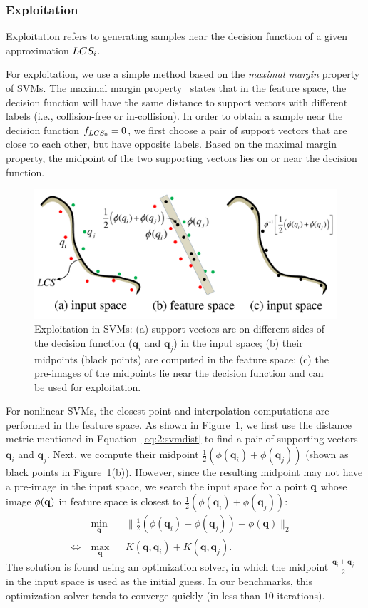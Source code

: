 \subsubsection{Exploitation}
Exploitation refers to generating samples near the decision
function of a given approximation $LCS_i$.

For exploitation, we use a simple method based on the \emph{maximal margin} property
of SVMs. The maximal margin
property~\cite{Vapnik:1995:NSL} states that in the feature space, the decision function
will have the same distance to support vectors with different
labels (i.e., collision-free or in-collision). In order to obtain a sample near the
decision function $f_{LCS_0} = 0$, we first choose a pair of support
vectors that are close to each other, but have opposite labels.
Based on the maximal margin property, the midpoint of the two
supporting vectors lies on or near the decision function.
\begin{figure}[!htb]
  \centering
  \includegraphics[width=0.6\linewidth]{figs/2/interpolation.pdf}
  \caption[Exploitation in SVMs]{Exploitation in SVMs:
  (a) support vectors are on different sides of the decision function ($\mathbf q_i$ and $\mathbf q_j$) in the input space;
  (b) their midpoints (black points) are computed in the feature space;
  (c) the pre-images of the midpoints lie near the decision function and can be used for exploitation.}
  \label{fig:2:interpolation}
\end{figure}
For nonlinear SVMs, the closest point and interpolation computations are
performed in the feature space. As shown in
Figure~\ref{fig:2:interpolation}, we first use the distance metric
mentioned in Equation~\ref{eq:2:svmdist} to find a pair of
supporting vectors $\mathbf q_i$ and $\mathbf q_j$. Next, we
compute their midpoint $\frac{1}{2}(\phi(\mathbf q_i) +
\phi(\mathbf q_j))$ (shown as black points in Figure~\ref{fig:2:interpolation}(b)). However, since the resulting midpoint may not have a pre-image in the input space, we search the input
space for a point $\mathbf q$ whose image $\phi(\mathbf q)$ in
feature space is closest to $\frac{1}{2}(\phi(\mathbf q_i) +
\phi(\mathbf q_j))$:
\begin{equation}
\begin{aligned}
\label{eq:2:preimage}
& \ \underset{\mathbf q}{\text{min}} & & \|\frac{1}{2}(\phi(\mathbf q_i) + \phi(\mathbf q_j)) - \phi(\mathbf q)\|_2 & \\
\Leftrightarrow & \ \underset{\mathbf q}{\text{max}} & & K(\mathbf q, \mathbf q_i) + K(\mathbf q, \mathbf q_j). &
\end{aligned}
\end{equation}
The solution is found using an optimization solver, in which the midpoint $\frac{\mathbf q_i +
\mathbf q_j}{2}$ in the input space is used as the initial guess. In our
benchmarks, this optimization solver tends to converge quickly
(in less than $10$ iterations).


